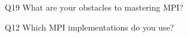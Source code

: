 \begin{description}%
\item{Q19} What are your obstacles to mastering MPI?%
\item{Q12} Which MPI implementations do you use?%
\end{description}%
